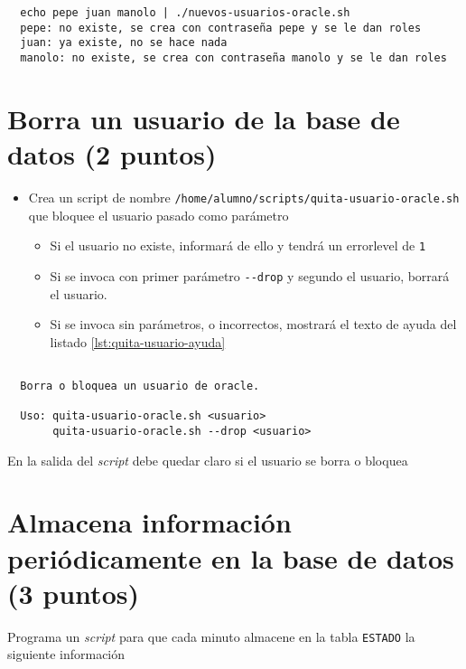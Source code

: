 \documentclass{article}
\begin{document}
\begin{lstlisting}
  echo pepe juan manolo | ./nuevos-usuarios-oracle.sh
  pepe: no existe, se crea con contraseña pepe y se le dan roles
  juan: ya existe, no se hace nada
  manolo: no existe, se crea con contraseña manolo y se le dan roles
\end{lstlisting}

\section{Borra un usuario de la base de datos (2 puntos)}
\label{sec:org0000009}
\begin{itemize}
\item Crea un script de nombre \texttt{/home/alumno/scripts/quita-usuario-oracle.sh} que bloquee el usuario pasado como parámetro
\begin{itemize}
\item Si el usuario no existe, informará de ello y tendrá un errorlevel de \texttt{1}
\item Si se invoca con primer parámetro \texttt{-{}-drop} y segundo el usuario, borrará el usuario.
\item Si se invoca sin parámetros, o incorrectos, mostrará el texto de ayuda del listado \ref{lst:quita-usuario-ayuda}
\end{itemize}
\end{itemize}

\begin{lstlisting}

  Borra o bloquea un usuario de oracle.
  
  Uso: quita-usuario-oracle.sh <usuario>
       quita-usuario-oracle.sh --drop <usuario>
\end{lstlisting}

\begin{Aviso}
En la salida del \emph{script} debe quedar claro si el usuario se borra o bloquea
\end{Aviso}



\section{Almacena información periódicamente en la base de datos (3 puntos)}
\label{sec:org000000c}
Programa un \emph{script} para que cada minuto almacene en la tabla \texttt{ESTADO} la siguiente información
\end{document}
